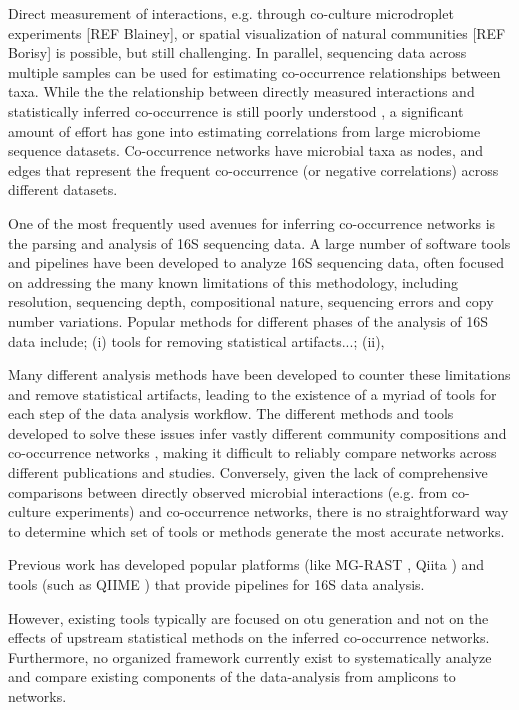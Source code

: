  Direct measurement of interactions, e.g. through co-culture microdroplet experiments [REF Blainey], or spatial visualization of natural communities [REF Borisy]  is possible, but still challenging.
 In parallel, sequencing data across multiple samples can be used for estimating co-occurrence relationships between taxa.
 While the the relationship between directly measured interactions and statistically inferred co-occurrence is still poorly understood \cite{Zuniga2017}, a significant amount of effort has gone into estimating correlations from large microbiome sequence datasets.
 Co-occurrence networks have microbial taxa as nodes, and edges that represent the frequent co-occurrence (or negative correlations) across different datasets. 

One of the most frequently used avenues for inferring co-occurrence networks is the parsing and analysis of 16S sequencing data. A large number of software tools and pipelines have been developed to analyze 16S sequencing data, often focused on addressing the many known limitations of this methodology, including resolution, sequencing depth, compositional nature, sequencing errors and copy number variations.  Popular methods for different phases of the analysis of 16S data include; (i) tools for removing statistical artifacts...; (ii), 

  Many different analysis methods have been developed \cite{Callahan2016,Amir2017,Friedman2012,Kurtz2015} to counter these limitations and remove statistical artifacts, leading to the existence of a myriad of tools for each step of the data analysis workflow.
  The different methods and tools developed to solve these issues infer vastly different community compositions and co-occurrence networks \cite{Golob2017,Weiss2016}, making it difficult to reliably compare networks across different publications and studies.
  Conversely, given the lack of comprehensive comparisons between directly observed microbial interactions (e.g. from co-culture experiments) and co-occurrence networks, there is no straightforward way to determine which set of tools or methods generate the most accurate networks.
 
 Previous work has developed popular platforms (like MG-RAST \cite{Keegan2016}, Qiita \cite{qiita}) and tools (such as QIIME \cite{Caporaso2010}) that provide pipelines for 16S data analysis.
 
 However, existing tools typically are focused on \ac{otu} generation and not on the effects of upstream statistical methods on the inferred co-occurrence networks.
 Furthermore, no organized framework currently exist to systematically analyze and compare existing components of the data-analysis from amplicons to networks.
  

